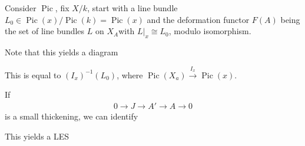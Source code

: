 Consider \({\operatorname{Pic}}\), fix \(X/k\), start with a line bundle
\(L_0 \in {\operatorname{Pic}}(x) /{\operatorname{Pic}}(k) = {\operatorname{Pic}}(x)\)
and the deformation functor \(F(A)\) being the set of line bundles \(L\)
on \(X_A\)with \({\left.{{L}} \right|_{{x}} } \cong L_0\), modulo
isomorphism.

Note that this yields a diagram

\begin{center}
\end{center}

This is equal to \((I_x)^{-1}(L_0)\), where
\({\operatorname{Pic}}(X_a) \xrightarrow{I_x} {\operatorname{Pic}}(x)\).

If
\begin{align*}
0 \to J \to A' \to A \to 0
\end{align*}
is a small thickening, we can identify

\begin{center}
\end{center}

This yields a LES

